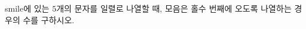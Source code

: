 \hspace*{2mm}\begin{minipage}[t]{\dimexpr\linewidth-2mm\relax}\vspace{0pt}
smile에 있는 $5$개의 문자를 일렬로 나열할 때, 모음은 홀수 번째에 오도록 나열하는 경우의 수를 구하시오.\end{minipage}
